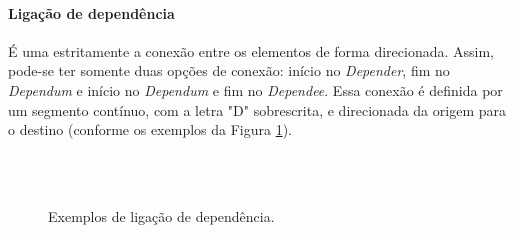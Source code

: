             \paragraph{Ligação de dependência}
                É uma estritamente a conexão entre os elementos de forma direcionada.
                Assim, pode-se ter somente duas opções de conexão: início no \emph{Depender}, fim no \emph{Dependum} e início no \emph{Dependum} e fim no \emph{Dependee}. Essa conexão é definida por um segmento contínuo, com a letra "D" sobrescrita, e direcionada da origem para o destino (conforme os exemplos da Figura \ref{fig:dependency}).
                \begin{figure}[h!]
                    \centering
                        \\
                        ~
                        \caption{Exemplos de ligação de dependência.}
                        \label{fig:dependency}
                \end{figure}
                
